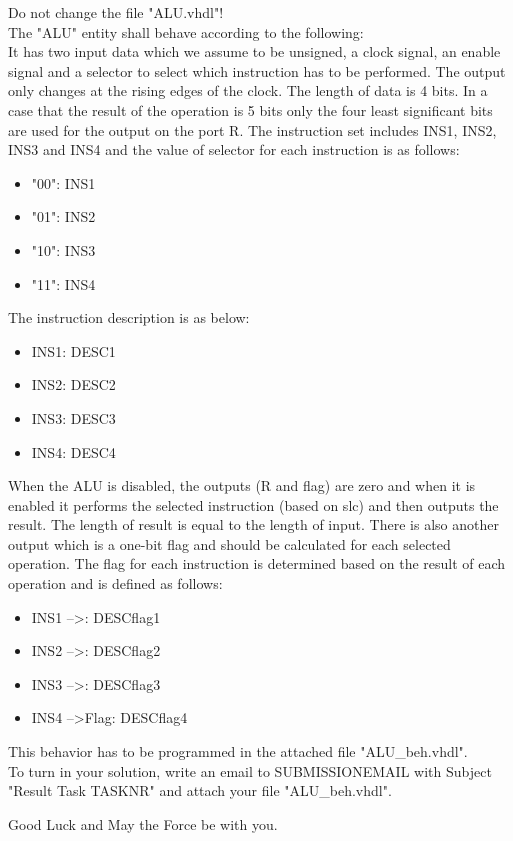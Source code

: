 \documentclass[a4paper,12pt]{article}
\begin{document}
Do not change the file "ALU.vhdl"!
\\

The "ALU" entity shall behave according to the following:
\\
It has two input data which we assume to be unsigned, a clock signal, an enable signal and a selector to select which instruction has to be performed. The output only changes at the rising edges of the clock. The length of data is 4 bits. In a case that the result of the operation is 5 bits only the four least significant bits are used for the output on the port R. The instruction set includes {{INS1}}, {{INS2}}, {{INS3}} and {{INS4}} and the value of selector for each instruction is as follows:
\\
\begin{itemize}
\item "00": {{INS1}}
\item "01": {{INS2}}
\item "10": {{INS3}}
\item "11": {{INS4}}
\end{itemize}
\vspace{0.3cm}

The instruction description is as below:
\begin{itemize}
\item {{INS1}}: {{DESC1}}
\item {{INS2}}: {{DESC2}}
\item {{INS3}}: {{DESC3}}
\item {{INS4}}: {{DESC4}}
\end{itemize}
\vspace{0.3cm}

When the ALU is disabled, the outputs (R and flag) are zero and when it is enabled it performs the selected instruction (based on slc) and then outputs the result. The length of result is equal to the length of input. There is also another output which is a one-bit flag and should be calculated for each selected operation. The flag for each instruction is determined based on the result of each operation and is defined as follows:
\begin{itemize}
\item {{INS1}} --\textgreater {}: {{DESCflag1}}
\item {{INS2}} --\textgreater {}: {{DESCflag2}}
\item {{INS3}} --\textgreater {}: {{DESCflag3}}
\item {{INS4}} --\textgreater \enspace Flag: {{DESCflag4}}
\end{itemize}
\vspace{0.3cm}

This behavior has to be programmed in the attached file "ALU\_beh.vhdl".
\\

To turn in your solution, write an email to {{SUBMISSIONEMAIL}} with Subject "Result Task {{TASKNR}}" and attach your file "ALU\_beh.vhdl".

\vspace{0.7cm}

Good Luck and May the Force be with you.
\end{document}
